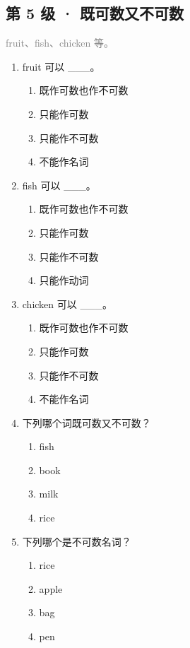\documentclass[11pt,a4paper]{ctexart}
\begin{document}
\subsection*{第 5 级 · 既可数又不可数}
\noindent\textcolor{gray}{fruit、fish、chicken 等。}\par\smallskip
\begin{enumerate}[leftmargin=*,itemsep=4pt]
\item fruit 可以 \_\_\_。
\begin{enumerate}[label=\Alph*.,leftmargin=2em,itemsep=1pt,topsep=2pt]
\item 既作可数也作不可数
\item 只能作可数
\item 只能作不可数
\item 不能作名词
\end{enumerate}
\item fish 可以 \_\_\_。
\begin{enumerate}[label=\Alph*.,leftmargin=2em,itemsep=1pt,topsep=2pt]
\item 既作可数也作不可数
\item 只能作可数
\item 只能作不可数
\item 只能作动词
\end{enumerate}
\item chicken 可以 \_\_\_。
\begin{enumerate}[label=\Alph*.,leftmargin=2em,itemsep=1pt,topsep=2pt]
\item 既作可数也作不可数
\item 只能作可数
\item 只能作不可数
\item 不能作名词
\end{enumerate}
\item 下列哪个词既可数又不可数？
\begin{enumerate}[label=\Alph*.,leftmargin=2em,itemsep=1pt,topsep=2pt]
\item fish
\item book
\item milk
\item rice
\end{enumerate}
\item 下列哪个是不可数名词？
\begin{enumerate}[label=\Alph*.,leftmargin=2em,itemsep=1pt,topsep=2pt]
\item rice
\item apple
\item bag
\item pen

\end{enumerate}
\end{enumerate}
\end{document}
